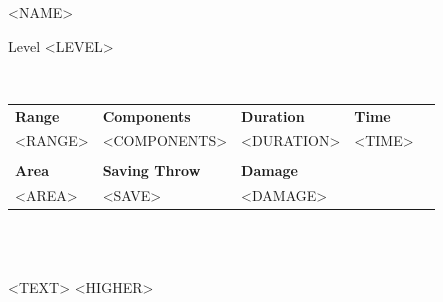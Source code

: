 \begin{figure}%
\begin{framed}

\begin{minipage}{0.5\textwidth}
    \huge
    <NAME>
\end{minipage}
\begin{minipage}{0.45\textwidth}
    \flushright
    Level <LEVEL>
\end{minipage}\\
\medskip
\phantom{0}

\begin{center}
	\begin{tabularx}{1.0\textwidth}{XXXXX}
	    \textbf{Range} & \textbf{Components} & \textbf{Duration} & \textbf{Time}\\
	    <RANGE> & <COMPONENTS> & <DURATION> & <TIME>\\
	    & & & \\
	    \textbf{Area} & \textbf{Saving Throw} & \textbf{Damage} & \\
	    <AREA> & <SAVE> & <DAMAGE>
	\end{tabularx}\\
\end{center}

\phantom{0}\\
<TEXT>
<HIGHER>
\smallskip
\end{framed}
\end{figure}